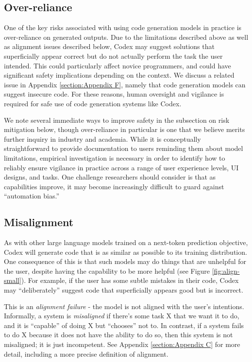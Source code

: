 \subsection{Over-reliance}
\label{sec:overreliance}

One of the key risks associated with using code generation models in practice is over-reliance on generated outputs. Due to the limitations described above as well as alignment issues described below, Codex may suggest solutions that superficially appear correct but do not actually perform the task the user intended. This could particularly affect novice programmers, and could have significant safety implications depending on the context. We discuss a related issue in Appendix \ref{section:Appendix F}, namely that code generation models can suggest insecure code. For these reasons, human oversight and vigilance is required for safe use of code generation systems like Codex.

We note several immediate ways to improve safety in the subsection on risk mitigation below, though over-reliance in particular is one that we believe merits further inquiry in industry and academia. While it is conceptually straightforward to provide documentation to users reminding them about model limitations, empirical investigation is necessary in order to identify how to reliably ensure vigilance in practice across a range of user experience levels, UI designs, and tasks. One challenge researchers should consider is that as capabilities improve, it may become increasingly difficult to guard against ``automation bias.'' 

\subsection{Misalignment}
\label{sec:impacts:misalignment}
As with other large language models trained on a next-token prediction objective, Codex will generate code that is as similar as possible to its training distribution. One consequence of this is that such models may do things that are unhelpful for the user, despite having the capability to be more helpful (see Figure \ref{fig:align-small}). For example, if the user has some subtle mistakes in their code, Codex may ``deliberately'' suggest code that superficially appears good but is incorrect. 

This is an \textit{alignment failure} - the model is not aligned with the user's intentions. Informally, a system is \textit{misaligned} if there’s some task X that we want it to do, and it is ``capable'' of doing X but ``chooses'' not to.  In contrast, if a system fails to do X because it does not have the ability to do so, then this system is not misaligned; it is just incompetent. See Appendix \ref{section:Appendix C} for more detail, including a more precise definition of alignment. 


